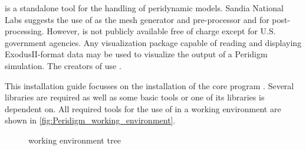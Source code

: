 \marktool[\tooladdress]{\toolnameshort} is a standalone tool for the handling of peridynamic models. Sandia National Labs suggests the use of \marktool[\cubitaddress]{\cubitname} as the mesh generator and pre-processor and \marktool[\paraviewname]{\paraviewname} for post-processing. However, \marktool[\cubitaddress]{\cubitname} is not publicly available free of charge except for U.S. government agencies. Any visualization package capable of reading and displaying ExodusII-format \cite{ExodusII1994} data may be used to
visualize the output of a Peridigm simulation. The creators of \marktool[\tooladdress]{\toolnameshort} use \marktool[\paraviewname]{\paraviewname}.

This installation guide focusses on the installation of the core program \marktool[\tooladdress]{\toolnameshort}. Several libraries are required as well as some basic tools \marktool[\tooladdress]{\toolnameshort} or one of its libraries is dependent on. All required tools for the use of \marktool[\tooladdress]{\toolnameshort} in a working environment are shown in \autoref{fig:Peridigm_working_environment}.

\begin{figure}[htbp]
\small
\footnotesize
\centering
{}
\caption{\toolname{} working environment tree}
\label{fig:Peridigm_working_environment}
\end{figure}

